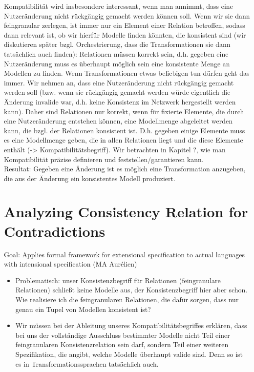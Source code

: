 Kompatibilität wird insbesondere interessant, wenn man annimmt, dass eine Nutzeränderung nicht rückgängig gemacht werden können soll. Wenn wir sie dann feingranular zerlegen, ist immer nur ein Element einer Relation betroffen, sodass dann relevant ist, ob wir hierfür Modelle finden könnten, die konsistent sind (wir diskutieren später bzgl. Orchestrierung, dass die Transformationen sie dann tatsächlich auch finden):
Relationen müssen korrekt sein, d.h. gegeben eine Nutzeränderung muss es überhaupt möglich sein eine konsistente Menge an Modellen zu finden. Wenn Transformationen etwas beliebigen tun dürfen geht das immer. Wir nehmen an, dass eine Nutzeränderung nicht rückgängig gemacht werden soll (bzw. wenn sie rückgängig gemacht werden würde eigentlich die Änderung invalide war, d.h. keine Konsistenz im Netzwerk hergestellt werden kann). Daher sind Relationen nur korrekt, wenn für fixierte Elemente, die durch eine Nutzeränderung entstehen können, eine Modellmenge abgeleitet werden kann, die bzgl. der Relationen konsistent ist. D.h. gegeben einige Elemente muss es eine Modellmenge geben, die in allen Relationen liegt und die diese Elemente enthält (-> Kompatibilitätsbegriff). Wir betrachten in Kapitel ?, wie man Kompatibilität präzise definieren und feststellen/garantieren kann.\\
Resultat: Gegeben eine Änderung ist es möglich eine Transformation anzugeben, die aus der Änderung ein konsistentes Modell produziert.

\section{Analyzing Consistency Relation for Contradictions}
Goal: Applies formal framework for extensional specification to actual languages with intensional specification (MA Aurélien)

\begin{itemize}
    \item Problematisch: unser Konsistenzbegriff für Relationen (feingranulare Relationen) schließt keine Modelle aus, der Konsistenzbegriff hier aber schon. Wie realisiere ich die feingranularen Relationen, die dafür sorgen, dass nur genau ein Tupel von Modellen konsistent ist?
    \item Wir müssen bei der Ableitung unseres Kompatibilitätsbegriffes erklären, dass bei uns der vollständige Ausschluss bestimmter Modelle nicht Teil einer feingranularen Konsistenzrelation sein darf, sondern Teil einer weiteren Spezifikation, die angibt, welche Modelle überhaupt valide sind. Denn so ist es in Transformationssprachen tatsächlich auch.
\end{itemize}



